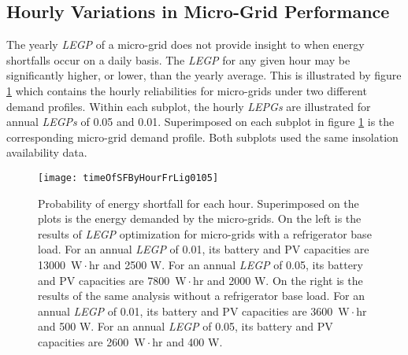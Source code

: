 \documentclass{article}
\newcommand{\unit}[1]{\ensuremath{\, \mathrm{#1}}}
\begin{document}
\subsection{Hourly Variations in Micro-Grid Performance}

	

The yearly \emph{LEGP} of a micro-grid does not provide insight to when energy shortfalls occur on a daily basis. 
The \emph{LEGP} for any given hour may be significantly higher, or lower, than the yearly average.  
This is illustrated by figure \ref{hourlyLEGP} which contains the hourly reliabilities for micro-grids under two different demand profiles.
Within each subplot, the hourly \emph{LEPGs} are illustrated for annual \emph{LEGPs} of 0.05 and 0.01. 
Superimposed on each subplot in figure \ref{hourlyLEGP} is the corresponding micro-grid demand profile. 
Both subplots used the same insolation availability data. 

\begin{figure}[ht]
\centering
\texttt{[image: timeOfSFByHourFrLig0105]}
\caption{Probability of energy shortfall for each hour. 
Superimposed on the plots is the energy demanded by the micro-grids. 
On the left is the results of \emph{LEGP} optimization for micro-grids with a refrigerator base load. 
For an annual \emph{LEGP} of 0.01, its battery and PV capacities are 13000 \unit{W \! \cdot \!hr} and 2500 W.
For an annual \emph{LEGP} of 0.05, its battery and PV capacities are 7800 \unit{W \! \cdot \!hr} and 2000 W.
On the right is the results of the same analysis without a refrigerator base load. 
For an annual \emph{LEGP} of 0.01, its battery and PV capacities are 3600 \unit{W \! \cdot \!hr} and 500 W.
For an annual \emph{LEGP} of 0.05, its battery and PV capacities are 2600 \unit{W \! \cdot \!hr} and 400 W.}
\label{hourlyLEGP}
\end{figure} 
\end{document}
